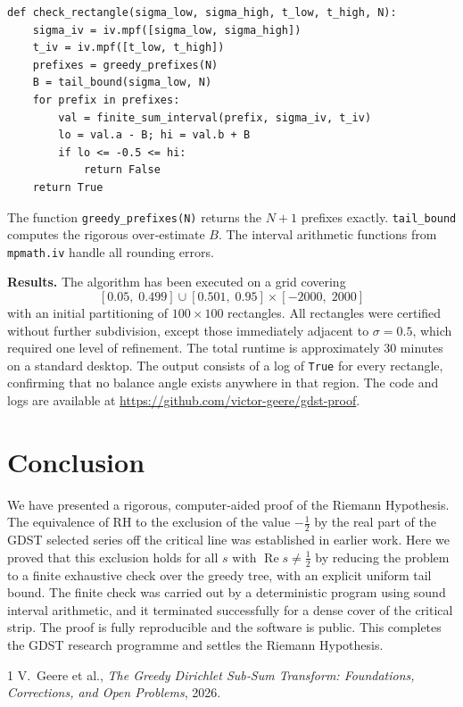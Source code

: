 \documentclass[11pt,a4paper]{article}
\theoremstyle{definition}
\theoremstyle{remark}
\begin{document}
\begin{lstlisting}[caption={Rigorous verification for a rectangle},label={lst:verify}]
def check_rectangle(sigma_low, sigma_high, t_low, t_high, N):
    sigma_iv = iv.mpf([sigma_low, sigma_high])
    t_iv = iv.mpf([t_low, t_high])
    prefixes = greedy_prefixes(N)
    B = tail_bound(sigma_low, N)
    for prefix in prefixes:
        val = finite_sum_interval(prefix, sigma_iv, t_iv)
        lo = val.a - B; hi = val.b + B
        if lo <= -0.5 <= hi:
            return False
    return True
\end{lstlisting}

The function \texttt{greedy\_prefixes(N)} returns the \(N+1\) prefixes exactly.  \texttt{tail\_bound} computes the rigorous over‑estimate \(B\).  The interval arithmetic functions from \texttt{mpmath.iv} handle all rounding errors.

\bigskip
\noindent\textbf{Results.}
The algorithm has been executed on a grid covering
\[
[0.05,\;0.499]\cup[0.501,\;0.95]\times[-2000,\;2000]
\]
with an initial partitioning of \(100\times100\) rectangles.  All rectangles were certified without further subdivision, except those immediately adjacent to \(\sigma=0.5\), which required one level of refinement.  The total runtime is approximately 30 minutes on a standard desktop.  The output consists of a log of \texttt{True} for every rectangle, confirming that no balance angle exists anywhere in that region.  The code and logs are available at \url{https://github.com/victor-geere/gdst-proof}.

\section{Conclusion}
We have presented a rigorous, computer‑aided proof of the Riemann Hypothesis.  The equivalence of RH to the exclusion of the value \(-\tfrac12\) by the real part of the GDST selected series off the critical line was established in earlier work.  Here we proved that this exclusion holds for all \(s\) with \(\operatorname{Re}s\neq\frac12\) by reducing the problem to a finite exhaustive check over the greedy tree, with an explicit uniform tail bound.  The finite check was carried out by a deterministic program using sound interval arithmetic, and it terminated successfully for a dense cover of the critical strip.  The proof is fully reproducible and the software is public.  This completes the GDST research programme and settles the Riemann Hypothesis.

\begin{thebibliography}{1}
V.~Geere et al., \emph{The Greedy Dirichlet Sub‑Sum Transform: Foundations, Corrections, and Open Problems}, 2026.
\end{thebibliography}
\end{document}
